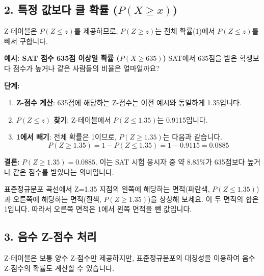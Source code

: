 \documentclass[11pt,a4paper]{article}
\theoremstyle{definition}
\begin{document}
\subsection{2. 특정 값보다 클 확률 ($P(X \ge x)$)}
Z-테이블은 $P(Z \le z)$를 제공하므로, $P(Z \ge z)$는 전체 확률(1)에서 $P(Z \le z)$를 빼서 구합니다.

\begin{examplebox}
\textbf{예시: SAT 점수 635점 이상일 확률 ($P(X \ge 635)$)}
SAT에서 635점을 받은 학생보다 점수가 높거나 같은 사람들의 비율은 얼마일까요?

\textbf{단계:}
\begin{enumerate}
    \item \textbf{Z-점수 계산}: 635점에 해당하는 Z-점수는 이전 예시와 동일하게 1.35입니다.
    \item \textbf{$P(Z \le z)$ 찾기}: Z-테이블에서 $P(Z \le 1.35)$는 0.9115입니다.
    \item \textbf{1에서 빼기}: 전체 확률은 1이므로, $P(Z \ge 1.35)$는 다음과 같습니다.
    \[ P(Z \ge 1.35) = 1 - P(Z \le 1.35) = 1 - 0.9115 = 0.0885 \]
\end{enumerate}
\textbf{결론:} $P(Z \ge 1.35) = 0.0885$. 이는 SAT 시험 응시자 중 약 8.85\%가 635점보다 높거나 같은 점수를 받았다는 의미입니다.

\begin{tcolorbox}[title=\textbf{시각적 이해}, colback=lightblue!50!white, colframe=darkblue]
표준정규분포 곡선에서 Z=1.35 지점의 왼쪽에 해당하는 면적(파란색, $P(Z \le 1.35)$)과 오른쪽에 해당하는 면적(흰색, $P(Z \ge 1.35)$)을 상상해 보세요. 이 두 면적의 합은 1입니다. 따라서 오른쪽 면적은 1에서 왼쪽 면적을 뺀 값입니다.
\end{tcolorbox}
\end{examplebox}

\subsection{3. 음수 Z-점수 처리}
Z-테이블은 보통 양수 Z-점수만 제공하지만, 표준정규분포의 대칭성을 이용하여 음수 Z-점수의 확률도 계산할 수 있습니다.
\end{document}
